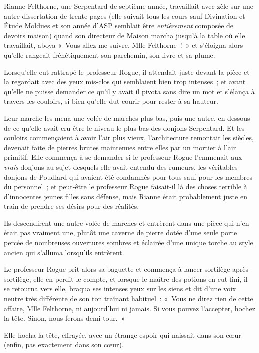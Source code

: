 \later

Rianne Felthorne, une Serpentard de septième année, travaillait avec zèle sur une autre dissertation de trente pages (elle suivait tous les cours sauf Divination et Étude Moldues et son année d'ASP semblait être \emph{entièrement} composée de devoirs maison) quand son directeur de Maison marcha jusqu'à la table où elle travaillait, aboya «~Vous allez me suivre, Mlle Felthorne~!~»
et s'éloigna alors qu'elle rangeait frénétiquement son parchemin, son livre et sa plume.

Lorsqu'elle eut rattrapé le professeur Rogue, il attendait juste devant la pièce et la regardait avec des yeux mis-clos qui semblaient bien trop intenses~; et avant qu'elle ne puisse demander ce qu'il y avait il pivota sans dire un mot et s'élança à travers les couloirs, si bien qu'elle dut courir pour rester à sa hauteur.

Leur marche les mena une volée de marches plus bas, puis une autre, en dessous de ce qu'elle avait cru être le niveau le plus bas des donjons Serpentard.
Et les couloirs commençaient à avoir l'air plus vieux, l'architecture remontait les siècles, devenait faite de pierres brutes maintenues entre elles par un mortier à l'air primitif.
Elle commença à se demander si le professeur Rogue l'emmenait aux \emph{vrais} donjons au sujet desquels elle avait entendu des rumeurs, les véritables donjons de Poudlard qui avaient été condamnés pour tous sauf pour les membres du personnel~; et peut-être le professeur Rogue faisait-il là des choses terrible à d'innocentes jeunes filles sans défense, mais Rianne était probablement juste en train de prendre ses désirs pour des réalités.

Ils descendirent une autre volée de marches et entrèrent dans une pièce qui n'en était pas vraiment une, plutôt une caverne de pierre dotée d'une seule porte percée de nombreuses ouvertures sombres et éclairée d'une unique torche au style ancien qui s'alluma lorsqu'ils entrèrent.

Le professeur Rogue prit alors sa baguette et commença à lancer sortilège après sortilège, elle en perdit le compte, et lorsque le maître des potions en eut fini, il se retourna vers elle, braqua ses intenses yeux sur les siens et dit d'une voix neutre très différente de son ton traînant habituel~: «~Vous ne direz rien de cette affaire, Mlle Felthorne, ni aujourd'hui ni jamais.
Si vous pouvez l'accepter, hochez la tête.
Sinon, nous ferons demi-tour.~»

Elle hocha la tête, effrayée, avec un étrange espoir qui naissait dans son cœur (enfin, pas exactement dans son cœur).

